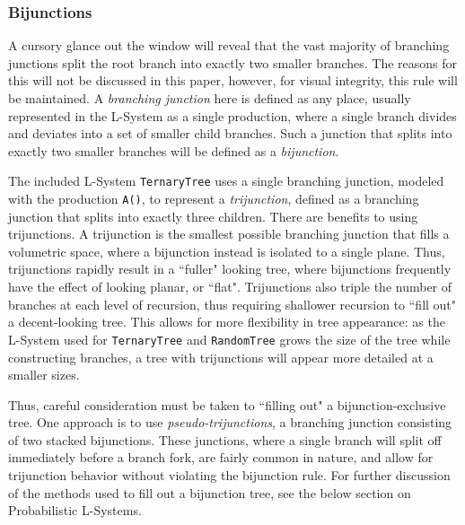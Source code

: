 \documentclass{article}
\newcommand{\tab}{\hspace*{2em}}
\begin{document}
            \subsubsection{Bijunctions}
    \tab A cursory glance out the window will reveal that the vast majority of branching junctions
split the root branch into exactly two smaller branches. The reasons for this will not be discussed in this
paper, however, for visual integrity, this rule will be maintained. A \emph{branching junction}
here is defined as any place, usually represented in the L-System as a single production, where a
single branch divides and deviates into a set of smaller child branches. Such a junction that
splits into exactly two smaller branches will be defined as a \emph{bijunction}.

    \tab The included L-System \verb|TernaryTree| uses a single branching junction, modeled with
the production \verb|A()|, to represent a \emph{trijunction}, defined as a branching junction that
splits into exactly three children\cite{abp96}. There are benefits to using trijunctions. A
trijunction is the smallest possible branching junction that fills a volumetric space, where a
bijunction instead is isolated to a single plane. Thus, trijunctions rapidly result in a ``fuller"
looking tree, where bijunctions frequently have the effect of looking planar, or ``flat".
Trijunctions also triple the number of branches at each level of recursion, thus requiring shallower recursion
to ``fill out" a decent-looking tree. This allows for more flexibility in tree appearance: as the
L-System used for \verb|TernaryTree| and \verb|RandomTree| grows the size of the tree while
constructing branches, a tree with trijunctions will appear more detailed at a smaller sizes.

    \tab Thus, careful consideration must be taken to ``filling out" a bijunction-exclusive tree.
One approach is to use \emph{pseudo-trijunctions}, a branching junction consisting of two stacked
bijunctions. These junctions, where a single branch will split off immediately before a branch
fork, are fairly common in nature, and allow for trijunction behavior without violating the
bijunction rule. For further discussion of the methods used to fill out a bijunction tree, see the
below section on Probabilistic L-Systems.

\end{document}
